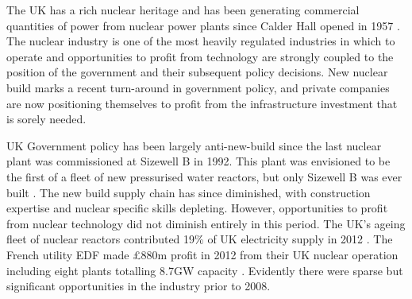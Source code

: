 {}

The UK has a rich nuclear heritage and has been generating commercial quantities of power from nuclear power plants since Calder Hall opened in 1957 \cite{NDA2007}. 
The nuclear industry is one of the most heavily regulated industries in which to operate and opportunities to profit from technology are strongly coupled to the position of the government and their subsequent policy decisions. 
New nuclear build marks a recent turn-around in government policy, and private companies are now positioning themselves to profit from the infrastructure investment that is sorely needed.

UK Government policy has been largely anti-new-build since the last nuclear plant was commissioned at Sizewell B in 1992. 
This plant was envisioned to be the first of a fleet of new pressurised water reactors, but only Sizewell B was ever built \cite{WNA2014}. 
The new build supply chain has since diminished, with construction expertise and nuclear specific skills depleting.
However, opportunities to profit from nuclear technology did not diminish entirely in this period. 
The UK's ageing fleet of nuclear reactors contributed 19\% of UK electricity supply in 2012 \cite{WNA2014}.  
The French utility EDF made \pounds880m profit in 2012 from their UK nuclear operation including eight plants totalling 8.7GW capacity \cite{EDF2012}. 
Evidently there were sparse but significant opportunities in the industry prior to 2008.

